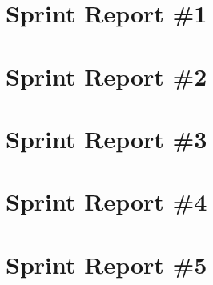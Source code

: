 
\section{Sprint Report \#1}


\newpage
\section{Sprint Report \#2}


\newpage
\section{Sprint Report \#3}


\newpage
\section{Sprint Report \#4}


\newpage
\section{Sprint Report \#5}

